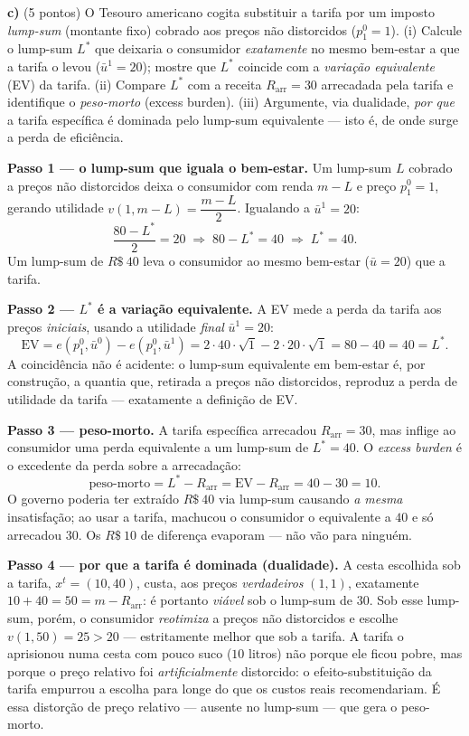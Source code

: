 \textbf{c)} (5 pontos) O Tesouro americano cogita substituir a tarifa por um imposto \emph{lump-sum} (montante fixo) cobrado aos preços não distorcidos ($p_1^{0}=1$). (i) Calcule o lump-sum $L^{*}$ que deixaria o consumidor \emph{exatamente} no mesmo bem-estar a que a tarifa o levou ($\bar u^{1}=20$); mostre que $L^{*}$ coincide com a \emph{variação equivalente} (EV) da tarifa. (ii) Compare $L^{*}$ com a receita $R_{\text{arr}}=30$ arrecadada pela tarifa e identifique o \emph{peso-morto} (excess burden). (iii) Argumente, via dualidade, \emph{por que} a tarifa específica é dominada pelo lump-sum equivalente --- isto é, de onde surge a perda de eficiência.
\resolucaobox{7.2cm}
\begin{solucao}
\textbf{Passo 1 --- o lump-sum que iguala o bem-estar.} Um lump-sum $L$ cobrado a preços não distorcidos deixa o consumidor com renda $m-L$ e preço $p_1^{0}=1$, gerando utilidade $v(1,m-L)=\dfrac{m-L}{2}$. Igualando a $\bar u^{1}=20$:
\[
\frac{80-L^{*}}{2}=20\;\Rightarrow\; 80-L^{*}=40\;\Rightarrow\; L^{*}=40.
\]
Um lump-sum de $R\$~40$ leva o consumidor ao mesmo bem-estar ($\bar u=20$) que a tarifa.

\textbf{Passo 2 --- $L^{*}$ é a variação equivalente.} A EV mede a perda da tarifa aos preços \emph{iniciais}, usando a utilidade \emph{final} $\bar u^{1}=20$:
\[
\mathrm{EV}=e(p_1^{0},\bar u^{0})-e(p_1^{0},\bar u^{1})=2\cdot 40\cdot\sqrt{1}-2\cdot 20\cdot\sqrt{1}=80-40=40=L^{*}.
\]
A coincidência não é acidente: o lump-sum equivalente em bem-estar é, por construção, a quantia que, retirada a preços não distorcidos, reproduz a perda de utilidade da tarifa --- exatamente a definição de EV.

\textbf{Passo 3 --- peso-morto.} A tarifa específica arrecadou $R_{\text{arr}}=30$, mas inflige ao consumidor uma perda equivalente a um lump-sum de $L^{*}=40$. O \emph{excess burden} é o excedente da perda sobre a arrecadação:
\[
\text{peso-morto}=L^{*}-R_{\text{arr}}=\mathrm{EV}-R_{\text{arr}}=40-30=10.
\]
O governo poderia ter extraído $R\$~40$ via lump-sum causando \emph{a mesma} insatisfação; ao usar a tarifa, machucou o consumidor o equivalente a $40$ e só arrecadou $30$. Os $R\$~10$ de diferença evaporam --- não vão para ninguém.

\textbf{Passo 4 --- por que a tarifa é dominada (dualidade).} A cesta escolhida sob a tarifa, $x^{t}=(10,40)$, custa, aos preços \emph{verdadeiros} $(1,1)$, exatamente $10+40=50=m-R_{\text{arr}}$: é portanto \emph{viável} sob o lump-sum de $30$. Sob esse lump-sum, porém, o consumidor \emph{reotimiza} a preços não distorcidos e escolhe $v(1,50)=25>20$ --- estritamente melhor que sob a tarifa. A tarifa o aprisionou numa cesta com pouco suco ($10$ litros) não porque ele ficou pobre, mas porque o preço relativo foi \emph{artificialmente} distorcido: o efeito-substituição da tarifa empurrou a escolha para longe do que os custos reais recomendariam. É essa distorção de preço relativo --- ausente no lump-sum --- que gera o peso-morto.


\end{solucao}
